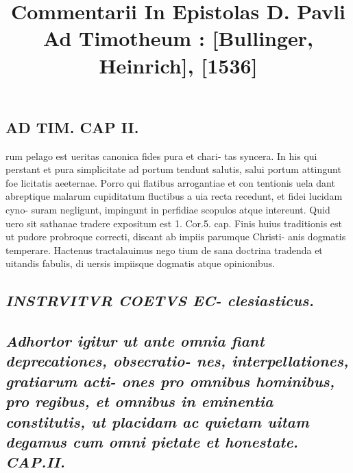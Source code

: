 \documentclass{article}
\begin{document}
\date{}
        \title{Commentarii In Epistolas D. Pavli Ad Timotheum : [Bullinger, Heinrich], [1536]}
\maketitle
\tableofcontents
\clearpage
\begin{pages} 
\beginnumbering
        
\section*{AD TIM. CAP II. }
\marginpar{[ p.107 ]}\pstart rum pelago est ueritas canonica fides pura et chari- tas syncera. In his qui perstant et pura simplicitate ad portum tendunt salutis, salui portum attingunt foe licitatis aeeternae. Porro qui flatibus arrogantiae et con tentionis uela dant abreptique malarum cupiditatum fluctibus a uia recta recedunt, et fidei lucidam cyno- suram negligunt, impingunt in perfidiae scopulos atque intereunt. Quid uero sit sathanae tradere expositum est 1. Cor.5. cap. Finis huius traditionis est ut pudore probroque correcti, discant ab impiis parumque Christi- anis dogmatis temperare. Hactenus tractalauimus nego tium de sana doctrina tradenda et uitandis fabulis, di uersis impiisque dogmatis atque opinionibus.  \pend 
{}
{}
\subsection*{\textit{INSTRVITVR COETVS EC- clesiasticus. }} 
{}
\subsection*{\textit{Adhortor igitur ut ante omnia fiant deprecationes, obsecratio- nes, interpellationes, gratiarum acti- ones pro omnibus hominibus, pro regibus, et omnibus in eminentia constitutis, ut placidam ac quietam uitam degamus cum omni pietate et honestate. CAP.II. }}

\end{pages}
\end{document}
